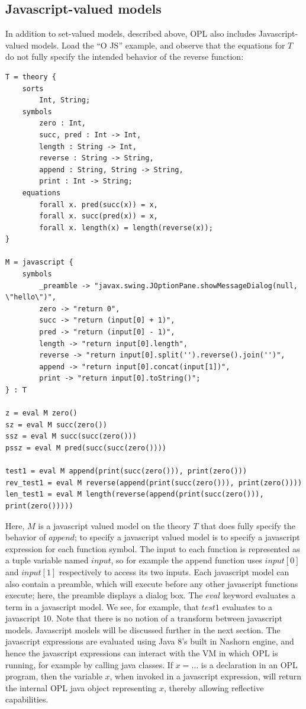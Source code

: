 \documentclass[12pt]{article}
\begin{document}
\subsection{Javascript-valued models}
In addition to set-valued models, described above, OPL also includes Javascript-valued models.  Load the ``O JS'' example, and observe that the equations for $T$ do not fully specify the intended behavior of the reverse function:
\begin{verbatim}
T = theory {
	sorts 
		Int, String;
	symbols 
		zero : Int,
		succ, pred : Int -> Int,
		length : String -> Int,
		reverse : String -> String,
		append : String, String -> String,
		print : Int -> String;
	equations	
		forall x. pred(succ(x)) = x,
		forall x. succ(pred(x)) = x,
		forall x. length(x) = length(reverse(x));
}

M = javascript {
	symbols
		_preamble -> "javax.swing.JOptionPane.showMessageDialog(null, \"hello\")",
		zero -> "return 0",
		succ -> "return (input[0] + 1)",
		pred -> "return (input[0] - 1)",
		length -> "return input[0].length",
		reverse -> "return input[0].split('').reverse().join('')",
		append -> "return input[0].concat(input[1])",
		print -> "return input[0].toString()";
} : T

z = eval M zero()
sz = eval M succ(zero())
ssz = eval M succ(succ(zero()))
pssz = eval M pred(succ(succ(zero())))

test1 = eval M append(print(succ(zero())), print(zero()))
rev_test1 = eval M reverse(append(print(succ(zero())), print(zero())))
len_test1 = eval M length(reverse(append(print(succ(zero())), print(zero()))))
\end{verbatim}

Here, $M$ is a javascript valued model on the theory $T$ that does fully specify the behavior of $append$; to specify a javascript valued model is to specify a javascript expression for each function symbol.  The input to each function is represented as a tuple variable named $input$, so for example the append function uses $input[0]$ and $input[1]$ respectively to access its two inputs.  Each javascript model can also contain a preamble, which will execute before any other javascript functions execute; here, the preamble displays a dialog box.  The $eval$ keyword evaluates a term in  a javascript model.  We see, for example, that $test1$ evaluates to a javascript 10.  Note that there is no notion of a transform between javascript models.  Javascript models will be discussed further in the next section.  The javascript expressions are evaluated using Java 8's built in Nashorn engine, and hence the javascript expressions can interact with the VM in which OPL is running, for example by calling java classes.  If $x = \ldots$ is a declaration in an OPL program, then the variable $x$, when invoked in a javascript expression, will return the internal OPL java object representing $x$, thereby allowing reflective capabilities.
\end{document}
